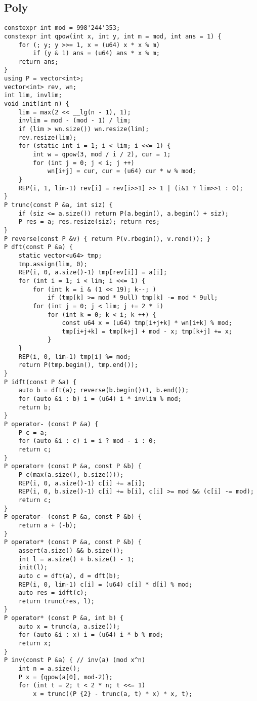 \documentclass[a4paper,landscape,twocolumn]{ctexart}
\begin{document}
\subsection{Poly}

\begin{lstlisting}[basicstyle=\footnotesize\ttfamily]
constexpr int mod = 998'244'353;
constexpr int qpow(int x, int y, int m = mod, int ans = 1) {
	for (; y; y >>= 1, x = (u64) x * x % m)
		if (y & 1) ans = (u64) ans * x % m;
	return ans;
}
using P = vector<int>;
vector<int> rev, wn;
int lim, invlim;
void init(int n) {
	lim = max(2 << __lg(n - 1), 1);
	invlim = mod - (mod - 1) / lim;
	if (lim > wn.size()) wn.resize(lim);
	rev.resize(lim);
	for (static int i = 1; i < lim; i <<= 1) {
		int w = qpow(3, mod / i / 2), cur = 1;
		for (int j = 0; j < i; j ++)
			wn[i+j] = cur, cur = (u64) cur * w % mod;
	}
	REP(i, 1, lim-1) rev[i] = rev[i>>1] >> 1 | (i&1 ? lim>>1 : 0);
}
P trunc(const P &a, int siz) {
	if (siz <= a.size()) return P(a.begin(), a.begin() + siz);
	P res = a; res.resize(siz); return res;
}
P reverse(const P &v) { return P(v.rbegin(), v.rend()); }
P dft(const P &a) {
	static vector<u64> tmp;
	tmp.assign(lim, 0);
	REP(i, 0, a.size()-1) tmp[rev[i]] = a[i];
	for (int i = 1; i < lim; i <<= 1) {
		for (int k = i & (1 << 19); k--; )
			if (tmp[k] >= mod * 9ull) tmp[k] -= mod * 9ull;
		for (int j = 0; j < lim; j += 2 * i)
			for (int k = 0; k < i; k ++) {
				const u64 x = (u64) tmp[i+j+k] * wn[i+k] % mod;
				tmp[i+j+k] = tmp[k+j] + mod - x; tmp[k+j] += x;
			}
	}
	REP(i, 0, lim-1) tmp[i] %= mod;
	return P(tmp.begin(), tmp.end());
}
P idft(const P &a) {
	auto b = dft(a); reverse(b.begin()+1, b.end());
	for (auto &i : b) i = (u64) i * invlim % mod;
	return b;
}
P operator- (const P &a) {
	P c = a;
	for (auto &i : c) i = i ? mod - i : 0;
	return c;
}
P operator+ (const P &a, const P &b) {
	P c(max(a.size(), b.size()));
	REP(i, 0, a.size()-1) c[i] += a[i];
	REP(i, 0, b.size()-1) c[i] += b[i], c[i] >= mod && (c[i] -= mod);
	return c;
}
P operator- (const P &a, const P &b) {
	return a + (-b);
}
P operator* (const P &a, const P &b) {
	assert(a.size() && b.size());
	int l = a.size() + b.size() - 1;
	init(l);
	auto c = dft(a), d = dft(b);
	REP(i, 0, lim-1) c[i] = (u64) c[i] * d[i] % mod;
	auto res = idft(c);
	return trunc(res, l);
}
P operator* (const P &a, int b) {
	auto x = trunc(a, a.size());
	for (auto &i : x) i = (u64) i * b % mod;
	return x;
}
P inv(const P &a) { // inv(a) (mod x^n)
	int n = a.size();
	P x = {qpow(a[0], mod-2)};
	for (int t = 2; t < 2 * n; t <<= 1)
		x = trunc((P {2} - trunc(a, t) * x) * x, t);

\end{lstlisting}
\end{document}
